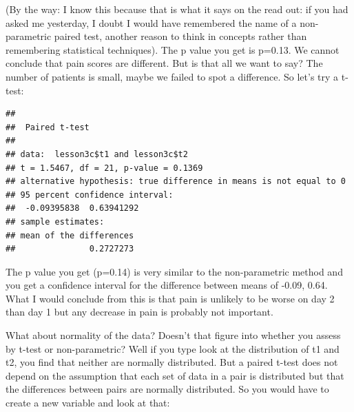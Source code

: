 \documentclass[]{book}
\newenvironment{Shaded}{\begin{snugshade}}{\end{snugshade}}
\newcommand{\DataTypeTok}[1]{\textcolor[rgb]{0.13,0.29,0.53}{#1}}
\newcommand{\KeywordTok}[1]{\textcolor[rgb]{0.13,0.29,0.53}{\textbf{#1}}}
\newcommand{\NormalTok}[1]{#1}
\newcommand{\OperatorTok}[1]{\textcolor[rgb]{0.81,0.36,0.00}{\textbf{#1}}}
\newcommand{\OtherTok}[1]{\textcolor[rgb]{0.56,0.35,0.01}{#1}}
\newcommand{\StringTok}[1]{\textcolor[rgb]{0.31,0.60,0.02}{#1}}
\begin{document}
(By the way: I know this because that is what it says on the read out:
if you had asked me yesterday, I doubt I would have remembered the name
of a non-parametric paired test, another reason to think in concepts
rather than remembering statistical techniques). The p value you get is
p=0.13. We cannot conclude that pain scores are different. But is that
all we want to say? The number of patients is small, maybe we failed to
spot a difference. So let's try a t-test:

\begin{Shaded}
\end{Shaded}

\begin{verbatim}
## 
##  Paired t-test
## 
## data:  lesson3c$t1 and lesson3c$t2
## t = 1.5467, df = 21, p-value = 0.1369
## alternative hypothesis: true difference in means is not equal to 0
## 95 percent confidence interval:
##  -0.09395838  0.63941292
## sample estimates:
## mean of the differences 
##               0.2727273
\end{verbatim}

The p value you get (p=0.14) is very similar to the non-parametric
method and you get a confidence interval for the difference between
means of -0.09, 0.64. What I would conclude from this is that pain is
unlikely to be worse on day 2 than day 1 but any decrease in pain is
probably not important.

What about normality of the data? Doesn't that figure into whether you
assess by t-test or non-parametric? Well if you type look at the
distribution of t1 and t2, you find that neither are normally
distributed. But a paired t-test does not depend on the assumption that
each set of data in a pair is distributed but that the differences
between pairs are normally distributed. So you would have to create a
new variable and look at that:

\begin{Shaded}
\end{Shaded}
\end{document}
